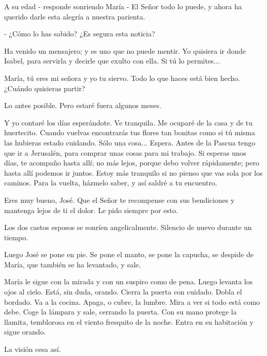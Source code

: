 \documentclass[12pt, twoside, openright]{book} %
\begin{document}
A su edad - responde sonriendo María - El Señor todo lo puede, y ahora ha querido darle esta alegría a nuestra parienta. 

- ¿Cómo lo has sabido? ¿Es segura esta noticia? 

Ha venido un mensajero; y es uno que no puede mentir. Yo quisiera ir donde Isabel, para servirla y decirle que exulto con ella. Si tú lo permites... 

María, tú eres mi señora y yo tu siervo. Todo lo que haces está bien hecho. ¿Cuándo quisieras partir? 

Lo antes posible. Pero estaré fuera algunos meses. 

Y yo contaré los días esperándote. Ve tranquila. Me ocuparé de la casa y de tu huertecito. Cuando vuelvas encontrarás tus flores tan bonitas como si tú misma las hubieras estado cuidando. Sólo una cosa... Espera. Antes de la Pascua tengo que ir a Jerusalén, para comprar unas cosas para mi trabajo. Si esperas unos días, te acompaño hasta allí; no más lejos, porque debo volver rápidamente; pero hasta allí podemos ir juntos. Estoy más tranquilo si no pienso que vas sola por los caminos. Para la vuelta, házmelo saber, y así saldré a tu encuentro. 

Eres muy bueno, José. Que el Señor te recompense con sus bendiciones y mantenga lejos de ti el dolor. Le pido siempre por esto. 

Los dos castos esposos se sonríen angelicalmente. Silencio de nuevo durante un tiempo. 

Luego José se pone en pie. Se pone el manto, se pone la capucha, se despide de María, que también se ha levantado, y sale. 

María le sigue con la mirada y con un suspiro como de pena. Luego levanta los ojos al cielo. Está, sin duda, orando. Cierra la puerta con cuidado. Dobla el bordado. Va a la cocina. Apaga, o cubre, la lumbre. Mira a ver si todo está como debe. Coge la lámpara y sale, cerrando la puerta. Con su mano protege la llamita, temblorosa en el viento fresquito de la noche. Entra en su habitación y sigue orando. 

La visión cesa así. 
\end{document}
